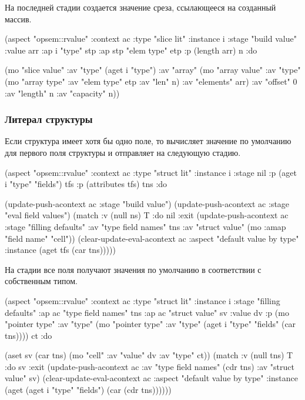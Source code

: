 \documentclass[12pt,twoside,russian]{article}
\newcommand{\textABMLString}[1]{{\color{abmlString}#1}}
\newcommand{\ABMLString}[1]{\abmlinline{\textABMLString{#1}}}
\begin{document}
На последней стадии \ABMLString{build value} создается значение среза, ссылающееся на созданный массив.

\begin{ABMLCode}
(aspect "opsem::rvalue" :context ac :type "slice lit" :instance i 
  :stage "build value" :value arr :ap i "type" stp 
  :ap stp "elem type" etp :p (length arr) n :do 
    
  (mo "slice value" 
    :av "type" (aget i "type")
    :av "array" (mo "array value" :av "type" (mo "array type" 
      :av "elem type" etp :av "len" n) :av "elements" arr)
    :av "offset" 0 
    :av "length" n
    :av "capacity" n))
\end{ABMLCode}

\subsubsection{Литерал структуры}
Если структура имеет хотя бы одно поле, то вычисляет значение по умолчанию для первого поля структуры и отправляет на следующую стадию.

\begin{ABMLCode}
(aspect "opsem::rvalue" :context ac :type "struct lit" :instance i 
  :stage nil :p (aget i "type" "fields") tfs 
  :p (attributes tfs) tns :do 
  
  (update-push-acontext ac :stage "build value")
  (update-push-acontext ac :stage "eval field values")
  (match :v (null ns) T :do nil 
  :exit (update-push-acontext ac 
          :stage "filling defaults" 
          :av "type field names" tns 
          :av "struct value" (mo :amap "field name" "cell"))
        (clear-update-eval-acontext ac 
          :aspect "default value by type" 
          :instance (aget tfs (car tns)))))
\end{ABMLCode}

На стадии \ABMLString{filling defaults} все поля получают значения по умолчанию в соответствии с собственным типом.

\begin{ABMLCode}
(aspect "opsem::rvalue" :context ac :type "struct lit" :instance i 
  :stage "filling defaults" :ap ac "type field names" tns 
  :ap ac "struct value" sv :value dv 
  :p (mo "pointer type" :av "type" (mo "pointer type" :av "type" 
  (aget i "type" "fields" (car tns)))) ct :do 
    
  (aset sv (car tns) (mo "cell" :av "value" dv :av "type" ct))
  (match :v (null tns) T 
  :do sv 
  :exit (update-push-acontext ac :av "type field names" (cdr tns) 
          :av "struct value" sv)
        (clear-update-eval-acontext ac :aspect "default value by type" 
          :instance (aget (aget i "type" "fields") (car (cdr tns))))))
\end{ABMLCode}
\end{document}
